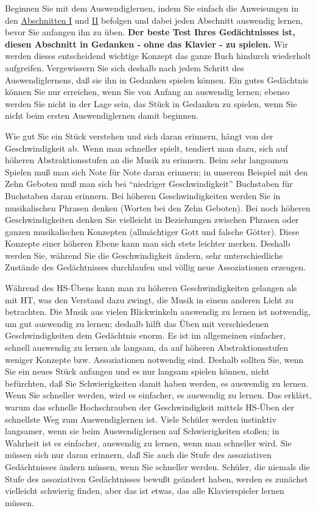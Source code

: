 Beginnen Sie mit dem Auswendiglernen, indem Sie einfach die Anweisungen in den \hyperref[c1i1]{Abschnitten I} und \hyperref[c1ii1]{II} befolgen und dabei jeden Abschnitt auswendig lernen, bevor Sie anfangen ihn zu üben.
\textbf{Der beste Test Ihres Gedächtnisses ist, diesen Abschnitt in Gedanken - ohne das Klavier - zu spielen.}
Wir werden dieses entscheidend wichtige Konzept das ganze Buch hindurch wiederholt aufgreifen.
Vergewissern Sie sich deshalb nach jedem Schritt des Auswendiglernens, daß sie ihn in Gedanken spielen können.
Ein gutes Gedächtnis können Sie nur erreichen, wenn Sie von Anfang an auswendig lernen; ebenso werden Sie nicht in der Lage sein, das Stück in Gedanken zu spielen, wenn Sie nicht beim ersten Auswendiglernen damit beginnen.

Wie gut Sie ein Stück verstehen und sich daran erinnern, hängt von der Geschwindigkeit ab.
Wenn man schneller spielt, tendiert man dazu, sich auf höheren Abstraktionsstufen an die Musik zu erinnern.
Beim sehr langsamen Spielen muß man sich Note für Note daran erinnern; in unserem Beispiel mit den Zehn Geboten muß man sich bei \enquote{niedriger Geschwindigkeit} Buchstaben für Buchstaben daran erinnern.
Bei höheren Geschwindigkeiten werden Sie in musikalischen Phrasen denken (Worten bei den Zehn Geboten).
Bei noch höheren Geschwindigkeiten denken Sie vielleicht in Beziehungen zwischen Phrasen oder ganzen musikalischen Konzepten (allmächtiger Gott und falsche Götter).
Diese Konzepte einer höheren Ebene kann man sich stets leichter merken.
Deshalb werden Sie, während Sie die Geschwindigkeit ändern, sehr unterschiedliche Zustände des Gedächtnisses durchlaufen und völlig neue Assoziationen erzeugen.

Während des HS-Übens kann man zu höheren Geschwindigkeiten gelangen als mit HT, was den Verstand dazu zwingt, die Musik in einem anderen Licht zu betrachten.
Die Musik aus vielen Blickwinkeln auswendig zu lernen ist notwendig, um gut auswendig zu lernen; deshalb hilft das Üben mit verschiedenen Geschwindigkeiten dem Gedächtnis enorm.
Es ist im allgemeinen einfacher, schnell auswendig zu lernen als langsam, da auf höheren Abstraktionsstufen weniger Konzepte bzw. Assoziationen notwendig sind.
Deshalb sollten Sie, wenn Sie ein neues Stück anfangen und es nur langsam spielen können, nicht befürchten, daß Sie Schwierigkeiten damit haben werden, es auswendig zu lernen.
Wenn Sie schneller werden, wird es einfacher, es auswendig zu lernen.
Das erklärt, warum das schnelle Hochschrauben der Geschwindigkeit mittels HS-Üben der schnellste Weg zum Auswendiglernen ist.
Viele Schüler werden instinktiv langsamer, wenn sie beim Auswendiglernen auf Schwierigkeiten stoßen; in Wahrheit ist es einfacher, auswendig zu lernen, wenn man schneller wird.
Sie müssen sich nur daran erinnern, daß Sie auch die Stufe des assoziativen Gedächtnisses ändern müssen, wenn Sie schneller werden.
Schüler, die niemals die Stufe des assoziativen Gedächtnisses bewußt geändert haben, werden es zunächst vielleicht schwierig finden, aber das ist etwas, das alle Klavierspieler lernen müssen.

